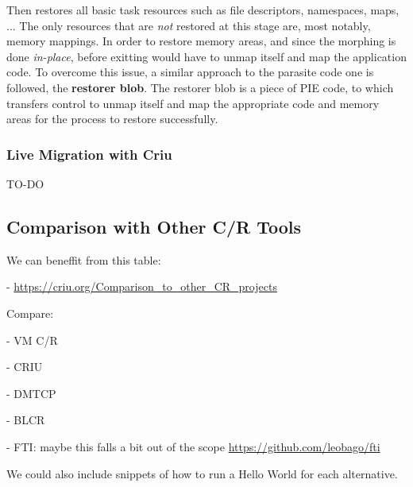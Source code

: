 Then \criu restores all basic task resources such as file descriptors, namespaces, maps, ...
The only resources that are \emph{not} restored at this stage are, most notably, memory mappings.
In order to restore memory areas, and since the morphing is done \textit{in-place}, before exitting \criu would have to unmap itself and map the application code.
To overcome this issue, a similar approach to the parasite code one is followed, the \textbf{restorer blob}.
The restorer blob is a piece of PIE code, to which \criu transfers control to unmap itself and map the appropriate code and memory areas for the process to restore successfully.

\subsubsection*{Live Migration with Criu}

TO-DO

\subsection{Comparison with Other C/R Tools}

We can beneffit from this table:

- \url{https://criu.org/Comparison_to_other_CR_projects}

Compare:

- VM C/R

- CRIU

- DMTCP

- BLCR

- FTI: maybe this falls a bit out of the scope \url{https://github.com/leobago/fti}

We could also include snippets of how to run a Hello World for each alternative.

